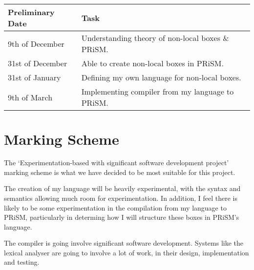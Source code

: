 \documentclass[11pt, a4paper]{article}
\begin{document}
\begin{center}
    \begin{tabular}{l | p{7.5cm}}
        Preliminary Date & Task \\
        \hline
        9th of December & Understanding theory of non-local boxes \& PRiSM. \\

        31st of December & Able to create non-local boxes in PRiSM. \\

        31st of January & Defining my own language for non-local boxes. \\

        9th of March & Implementing compiler from my language to PRiSM. \\
\end{tabular}
\end{center}


\section{Marking Scheme} %
\label{sec:marking_scheme}
The `Experimentation-based with significant software development project'
marking scheme is what we have decided to be most suitable for this project.

The creation of my language will be heavily experimental, with the syntax and
semantics allowing much room for experimentation. In addition, I feel there is
likely to be some experimentation in the compilation from my language to PRiSM,
particularly in determing how I will structure these boxes in PRiSM's language.

The compiler is going involve significant software development. Systems like the
lexical analyser are going to involve a lot of work, in their design,
implementation and testing.




\end{document}
